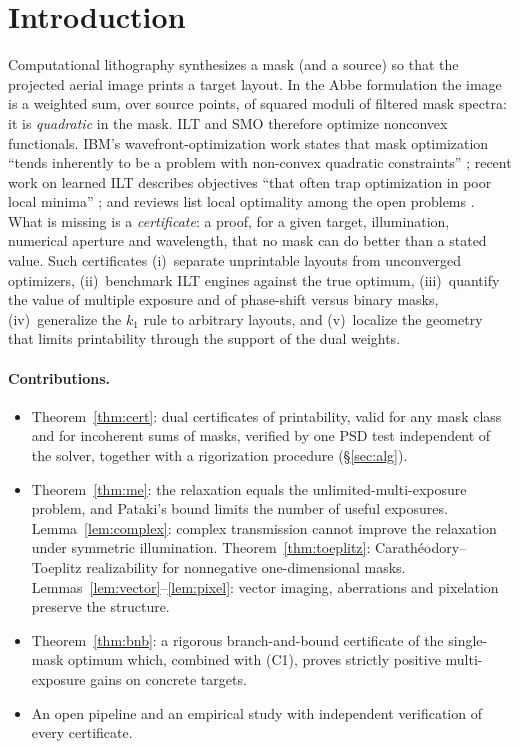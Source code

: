\documentclass[11pt,a4paper]{article}
\begin{document}
\section{Introduction}
Computational lithography synthesizes a mask (and a source) so that the projected aerial image prints a target layout. In the Abbe formulation the image is a weighted sum, over source points, of squared moduli of filtered mask spectra: it is \emph{quadratic} in the mask. ILT and SMO therefore optimize nonconvex functionals. IBM's wavefront-optimization work states that mask optimization ``tends inherently to be a problem with non-convex quadratic constraints'' \cite{rosenbluth2007}; recent work on learned ILT describes objectives ``that often trap optimization in poor local minima'' \cite{nvidia2026}; and reviews list local optimality among the open problems \cite{pang2021,yang2025}. What is missing is a \emph{certificate}: a proof, for a given target, illumination, numerical aperture and wavelength, that no mask can do better than a stated value. Such certificates (i)~separate unprintable layouts from unconverged optimizers, (ii)~benchmark ILT engines against the true optimum, (iii)~quantify the value of multiple exposure and of phase-shift versus binary masks, (iv)~generalize the $k_1$ rule to arbitrary layouts, and (v)~localize the geometry that limits printability through the support of the dual weights.

\paragraph{Contributions.}
\begin{itemize}
\item[(C1)] Theorem~\ref{thm:cert}: dual certificates of printability, valid for any mask class and for incoherent sums of masks, verified by one PSD test independent of the solver, together with a rigorization procedure (\S\ref{sec:alg}).
\item[(C2)] Theorem~\ref{thm:me}: the relaxation equals the unlimited-multi-exposure problem, and Pataki's bound limits the number of useful exposures. Lemma~\ref{lem:complex}: complex transmission cannot improve the relaxation under symmetric illumination. Theorem~\ref{thm:toeplitz}: Carath\'eodory--Toeplitz realizability for nonnegative one-dimensional masks. Lemmas~\ref{lem:vector}--\ref{lem:pixel}: vector imaging, aberrations and pixelation preserve the structure.
\item[(C3)] Theorem~\ref{thm:bnb}: a rigorous branch-and-bound certificate of the single-mask optimum which, combined with (C1), proves strictly positive multi-exposure gains on concrete targets.
\item[(C4)] An open pipeline and an empirical study with independent verification of every certificate.
\end{itemize}
\end{document}
